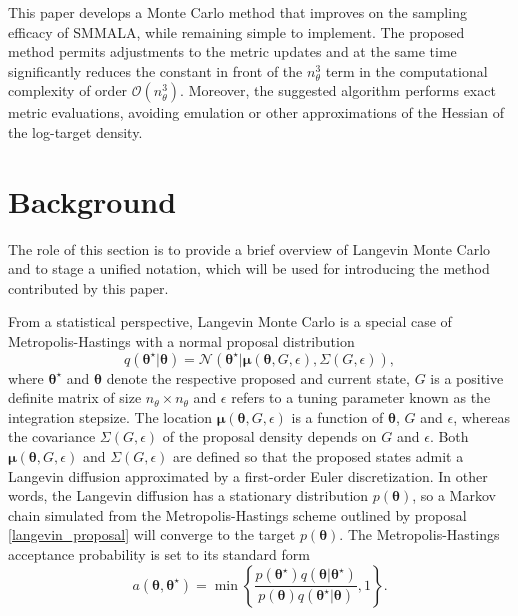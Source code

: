 \documentclass[twoside,11pt]{article}
\begin{document}
This paper develops a Monte Carlo method that improves on the sampling efficacy of SMMALA, while remaining simple to 
implement. The proposed method permits adjustments to the metric updates and at the same time significantly reduces the 
constant in front of the $n_\theta^3$ term in the computational complexity of order $\mathcal{O}(n_\theta^3)$. Moreover, the 
suggested algorithm performs exact metric evaluations, avoiding emulation or other approximations of the Hessian of the 
log-target density.

\section{Background}

The role of this section is to provide a brief overview of Langevin Monte Carlo and to stage a unified notation, which will
be used for introducing the method contributed by this paper.

From a statistical perspective, Langevin Monte Carlo is a special case of Metropolis-Hastings with a normal proposal
distribution
\begin{equation}
\label{langevin_proposal}
q(\boldsymbol{\theta}^{\star}|\boldsymbol{\theta}) =
\mathcal{N}(\boldsymbol{\theta}^{\star}|\boldsymbol{\mu}(\boldsymbol{\theta}, G, \epsilon), \Sigma(G, \epsilon)),
\end{equation}
where $\boldsymbol{\theta}^{\star}$ and $\boldsymbol{\theta}$ denote the respective proposed and current state, $G$ is a
positive definite matrix of size $n_{\theta} \times n_{\theta}$ and $\epsilon$ refers to a tuning parameter known as the
integration stepsize. The location $\boldsymbol{\mu}(\boldsymbol{\theta}, G, \epsilon)$ is a function of 
$\boldsymbol{\theta}$, $G$ and $\epsilon$, whereas the covariance $\Sigma(G, \epsilon)$ of the proposal density depends on 
$G$ and $\epsilon$. Both $\boldsymbol{\mu}(\boldsymbol{\theta}, G, \epsilon)$ and $\Sigma(G, \epsilon)$ are defined so that 
the proposed states admit a Langevin diffusion approximated by a first-order Euler discretization. In other words, the 
Langevin diffusion has a stationary distribution $p(\boldsymbol{\theta})$, so a Markov chain simulated from the 
Metropolis-Hastings scheme outlined by proposal \eqref{langevin_proposal} will converge to the target 
$p(\boldsymbol{\theta})$. The Metropolis-Hastings acceptance probability is set to its standard form
\begin{equation}
\label{langevin_acceptance}
a(\boldsymbol{\theta},\boldsymbol{\theta}^{\star}) =
\min\left\{
\frac{p(\boldsymbol{\theta}^{\star})q(\boldsymbol{\theta}|\boldsymbol{\theta}^{\star})}
{p(\boldsymbol{\theta})q(\boldsymbol{\theta}^{\star}|\boldsymbol{\theta})}
, 1
\right\}.
\end{equation}
\end{document}
